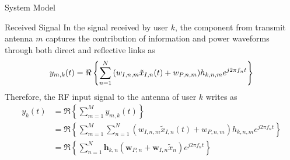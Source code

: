 \documentclass{IEEEtran}
\begin{document}
\begin{section} {System Model}
	\begin{subsection}	{Received Signal}
		In the signal received by user $k$, the component from transmit antenna $m$ captures the contribution of information and power waveforms through both direct and reflective links as
		\begin{equation}	\label{eq:y_{m,k}(t)}
			y_{m,k}(t)=\Re\left\{\sum_{n=1}^N{(w_{I,n,m}\tilde{x}_{I,n}(t)+w_{P,n,m})h_{k,n,m}e^{j2{\pi}{f_n}t}}\right\}
		\end{equation}
		Therefore, the RF input signal to the antenna of user $k$ writes as
		\begin{equation}	\label{eq:y_k(t)}
			\begin{split}
				y_k(t)
				&=\Re\left\{\sum_{m=1}^M{y_{m,k}(t)}\right\}	\\
				&=\Re\left\{\sum_{m=1}^M{\sum_{n=1}^N{(w_{I,n,m}\tilde{x}_{I,n}(t)+w_{P,n,m})h_{k,n,m}e^{j2{\pi}{f_n}t}}}\right\}	\\
				&=\Re\left\{\sum_{n=1}^N{\boldsymbol{h}_{k,n}(\boldsymbol{w}_{P,n}+\boldsymbol{w}_{I,n}\tilde{x}_n)e^{j2{\pi}{f_n}t}}\right\}
			\end{split}
		\end{equation}

\end{subsection}
\end{section}
\end{document}
